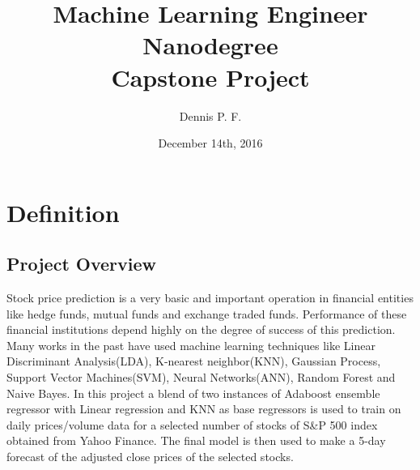 \documentclass[10pt]{report}
\begin{document}
\title{%
  Machine Learning Engineer Nanodegree \\
  \large Capstone Project}
\author{Dennis P. F.}
\date{December 14th, 2016}
\maketitle

\section{Definition}
\subsection*{Project Overview}
Stock price prediction is a very basic and important operation in financial entities like hedge funds, mutual funds and exchange traded funds. Performance of these financial institutions depend highly on the degree of success of this prediction. Many works in the past have used machine learning techniques like Linear Discriminant Analysis(LDA), K-nearest neighbor(KNN), Gaussian Process, Support Vector Machines(SVM), Neural Networks(ANN), Random Forest and Naive Bayes\cite{Ou2009}\cite{Patel2015}. In this project a blend of two instances of Adaboost ensemble regressor with Linear regression and KNN as base regressors is used to train on daily prices/volume data for a selected number of stocks of S\&P 500\cite{sp500} index obtained from Yahoo Finance. The final model is then used to make a 5-day forecast of the adjusted close prices\cite{adjclose} of the selected stocks.
\end{document}
